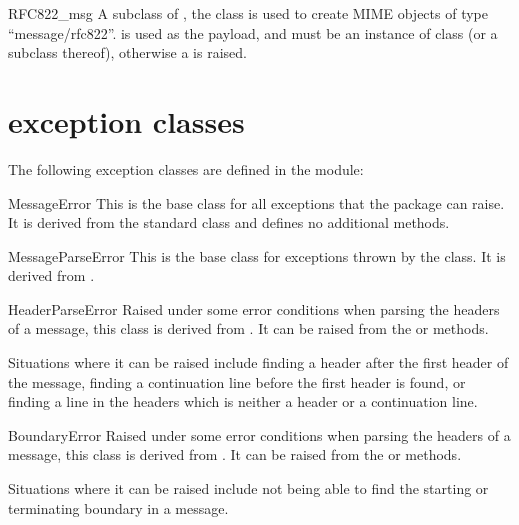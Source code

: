 \documentclass{howto}
\begin{document}
\begin{classdesc}{RFC822}{_msg}
A subclass of , the  class is used to
create MIME objects of type ``message/rfc822''.   is used as
the payload, and must be an instance of class  (or a
subclass thereof), otherwise a  is raised.
\end{classdesc}

\section{ exception classes}

The following exception classes are defined in the
 module:

\begin{excclassdesc}{MessageError}{}
This is the base class for all exceptions that the 
package can raise.  It is derived from the standard
 class and defines no additional methods.
\end{excclassdesc}

\begin{excclassdesc}{MessageParseError}{}
This is the base class for exceptions thrown by the 
class.  It is derived from .
\end{excclassdesc}

\begin{excclassdesc}{HeaderParseError}{}
Raised under some error conditions when parsing the  headers of
a message, this class is derived from .
It can be raised from the  or
 methods.

Situations where it can be raised include finding a 
header after the first  header of the message, finding a
continuation line before the first  header is found, or finding
a line in the headers which is neither a header or a continuation
line.
\end{excclassdesc}

\begin{excclassdesc}{BoundaryError}{}
Raised under some error conditions when parsing the  headers of
a message, this class is derived from .
It can be raised from the  or
 methods.

Situations where it can be raised include not being able to find the
starting or terminating boundary in a  message.
\end{excclassdesc}
\end{document}
